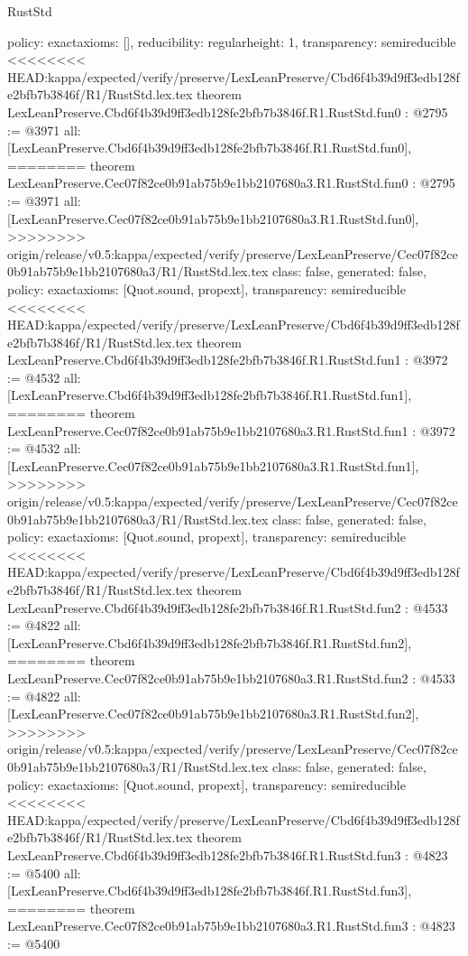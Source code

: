 \begin{lexlean}{RustStd}
\begin{coremodule}
{\begin{coremodule}
{{{  policy: exact{axioms: []},
  reducibility: regular{height: 1},
  transparency: semireducible
}
<<<<<<<< HEAD:kappa/expected/verify/preserve/LexLeanPreserve/Cbd6f4b39d9ff3edb128fe2bfb7b3846f/R1/RustStd.lex.tex
theorem LexLeanPreserve.Cbd6f4b39d9ff3edb128fe2bfb7b3846f.R1.RustStd.fun0 : @2795 := @3971 {
  all: [LexLeanPreserve.Cbd6f4b39d9ff3edb128fe2bfb7b3846f.R1.RustStd.fun0],
========
theorem LexLeanPreserve.Cec07f82ce0b91ab75b9e1bb2107680a3.R1.RustStd.fun0 : @2795 := @3971 {
  all: [LexLeanPreserve.Cec07f82ce0b91ab75b9e1bb2107680a3.R1.RustStd.fun0],
>>>>>>>> origin/release/v0.5:kappa/expected/verify/preserve/LexLeanPreserve/Cec07f82ce0b91ab75b9e1bb2107680a3/R1/RustStd.lex.tex
  class: false,
  generated: false,
  policy: exact{axioms: [Quot.sound, propext]},
  transparency: semireducible
}
<<<<<<<< HEAD:kappa/expected/verify/preserve/LexLeanPreserve/Cbd6f4b39d9ff3edb128fe2bfb7b3846f/R1/RustStd.lex.tex
theorem LexLeanPreserve.Cbd6f4b39d9ff3edb128fe2bfb7b3846f.R1.RustStd.fun1 : @3972 := @4532 {
  all: [LexLeanPreserve.Cbd6f4b39d9ff3edb128fe2bfb7b3846f.R1.RustStd.fun1],
========
theorem LexLeanPreserve.Cec07f82ce0b91ab75b9e1bb2107680a3.R1.RustStd.fun1 : @3972 := @4532 {
  all: [LexLeanPreserve.Cec07f82ce0b91ab75b9e1bb2107680a3.R1.RustStd.fun1],
>>>>>>>> origin/release/v0.5:kappa/expected/verify/preserve/LexLeanPreserve/Cec07f82ce0b91ab75b9e1bb2107680a3/R1/RustStd.lex.tex
  class: false,
  generated: false,
  policy: exact{axioms: [Quot.sound, propext]},
  transparency: semireducible
}
<<<<<<<< HEAD:kappa/expected/verify/preserve/LexLeanPreserve/Cbd6f4b39d9ff3edb128fe2bfb7b3846f/R1/RustStd.lex.tex
theorem LexLeanPreserve.Cbd6f4b39d9ff3edb128fe2bfb7b3846f.R1.RustStd.fun2 : @4533 := @4822 {
  all: [LexLeanPreserve.Cbd6f4b39d9ff3edb128fe2bfb7b3846f.R1.RustStd.fun2],
========
theorem LexLeanPreserve.Cec07f82ce0b91ab75b9e1bb2107680a3.R1.RustStd.fun2 : @4533 := @4822 {
  all: [LexLeanPreserve.Cec07f82ce0b91ab75b9e1bb2107680a3.R1.RustStd.fun2],
>>>>>>>> origin/release/v0.5:kappa/expected/verify/preserve/LexLeanPreserve/Cec07f82ce0b91ab75b9e1bb2107680a3/R1/RustStd.lex.tex
  class: false,
  generated: false,
  policy: exact{axioms: [Quot.sound, propext]},
  transparency: semireducible
}
<<<<<<<< HEAD:kappa/expected/verify/preserve/LexLeanPreserve/Cbd6f4b39d9ff3edb128fe2bfb7b3846f/R1/RustStd.lex.tex
theorem LexLeanPreserve.Cbd6f4b39d9ff3edb128fe2bfb7b3846f.R1.RustStd.fun3 : @4823 := @5400 {
  all: [LexLeanPreserve.Cbd6f4b39d9ff3edb128fe2bfb7b3846f.R1.RustStd.fun3],
========
theorem LexLeanPreserve.Cec07f82ce0b91ab75b9e1bb2107680a3.R1.RustStd.fun3 : @4823 := @5400 {
}}}}}}}
\end{coremodule}}
\end{coremodule}
\end{lexlean}
